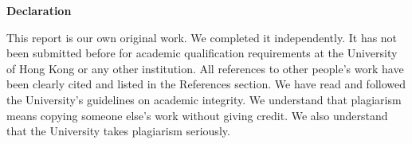 
\begin{center}
{\fontsize{16}{19}\selectfont\textbf{Declaration}}
\end{center}

\vspace{3mm}

This report is our own original work. We completed it independently. It has not been submitted before for academic qualification requirements at the University of Hong Kong or any other institution. All references to other people's work have been clearly cited and listed in the References section. We have read and followed the University's guidelines on academic integrity. We understand that plagiarism means copying someone else's work without giving credit. We also understand that the University takes plagiarism seriously.

\newpage
